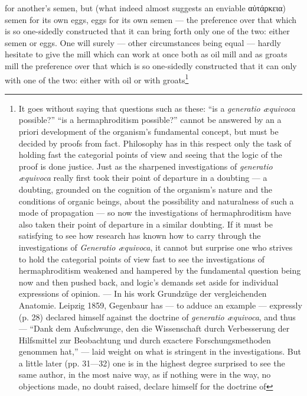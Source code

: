 \documentclass[12pt,a4paper]{book}
\begin{document}
\setcounter{footnote}{0}
for another's semen, but (what indeed almost suggests an enviable αὐτάρκεια) semen
for its own eggs, eggs for its own semen --- the preference over that which is so
one-sidedly constructed that it can bring forth only one of the two: either semen or
eggs. One will surely --- other circumstances being equal --- hardly hesitate to give
the mill which can work at once both as oil mill and as groats mill the preference
over that which is so one-sidedly constructed that it can only with one of the two:
either with oil or with
groats\footnote{It goes without saying that questions such as these: ``is a
\textit{generatio æquivoca} possible?'' ``is a hermaphroditism possible?'' cannot be
answered by an a priori development of the organism's fundamental concept, but must
be decided by proofs from fact. Philosophy has in this respect only the task of
holding fast the categorial points of view and seeing that the logic of the proof is
done justice. Just as the sharpened investigations of \textit{generatio æquivoca}
really first took their point of departure in a doubting --- a doubting, grounded on
the cognition of the organism's nature and the conditions of organic beings, about
the possibility and naturalness of such a mode of propagation --- so now the
investigations of hermaphroditism have also taken their point of departure in a
similar doubting. If it must be satisfying to see how research has known how to carry
through the investigations of \textit{Generatio æquivoca}, it cannot but surprise one
who strives to hold the categorial points of view fast to see the investigations of
hermaphroditism weakened and hampered by the fundamental question being now and then
pushed back, and logic's demands set aside for individual expressions of opinion. ---
In his work Grundzüge der vergleichenden Anatomie. Leipzig 1859, Gegenbaur has --- to
adduce an example --- expressly (p. 28) declared himself against the doctrine of
\textit{generatio æquivoca}, and thus --- ``Dank dem Aufschwunge, den die Wissenschaft
durch Verbesserung der Hilfsmittel zur Beobachtung und durch exactere
Forschungsmethoden genommen hat,'' --- laid weight on what is stringent in the
investigations. But a little later (pp. 31---32) one is in the highest degree
surprised to see the same author, in the most naive way, as if nothing were in the
way, no objections made, no doubt raised, declare himself for the doctrine of
}
\end{document}
